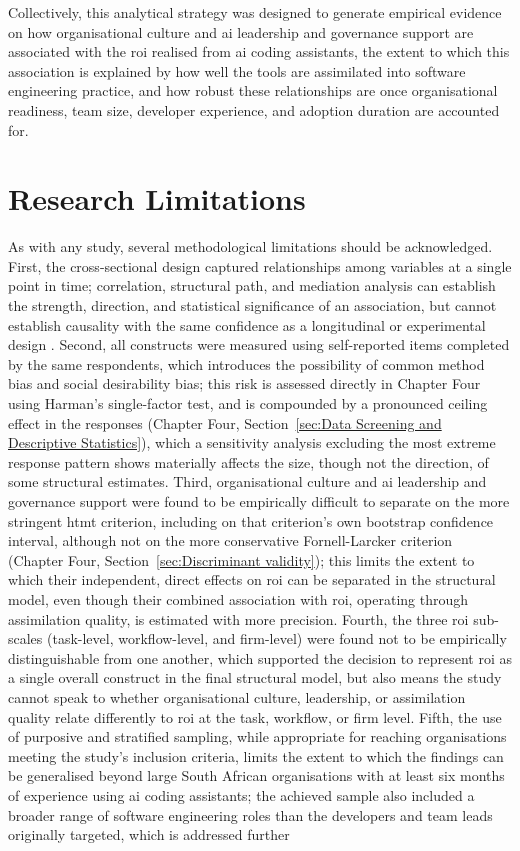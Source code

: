 Collectively, this analytical strategy was designed to generate empirical evidence on how organisational culture and \gls{ai} leadership and governance support are associated with the \gls{roi} realised from \gls{ai} coding assistants, the extent to which this association is explained by how well the tools are assimilated into software engineering practice, and how robust these relationships are once organisational readiness, team size, developer experience, and adoption duration are accounted for.

\section{Research Limitations}
\label{sec:Research Limitations}
As with any study, several methodological limitations should be acknowledged. First, the cross-sectional design captured relationships among variables at a single point in time; correlation, structural path, and mediation analysis can establish the strength, direction, and statistical significance of an association, but cannot establish causality with the same confidence as a longitudinal or experimental design \autocite{Creswell2018}. Second, all constructs were measured using self-reported items completed by the same respondents, which introduces the possibility of common method bias and social desirability bias; this risk is assessed directly in Chapter Four using Harman's single-factor test, and is compounded by a pronounced ceiling effect in the responses (Chapter Four, Section~\ref{sec:Data Screening and Descriptive Statistics}), which a sensitivity analysis excluding the most extreme response pattern shows materially affects the size, though not the direction, of some structural estimates. Third, organisational culture and \gls{ai} leadership and governance support were found to be empirically difficult to separate on the more stringent \gls{htmt} criterion, including on that criterion's own bootstrap confidence interval, although not on the more conservative Fornell-Larcker criterion (Chapter Four, Section~\ref{sec:Discriminant validity}); this limits the extent to which their independent, direct effects on \gls{roi} can be separated in the structural model, even though their combined association with \gls{roi}, operating through assimilation quality, is estimated with more precision. Fourth, the three \gls{roi} sub-scales (task-level, workflow-level, and firm-level) were found not to be empirically distinguishable from one another, which supported the decision to represent \gls{roi} as a single overall construct in the final structural model, but also means the study cannot speak to whether organisational culture, leadership, or assimilation quality relate differently to \gls{roi} at the task, workflow, or firm level. Fifth, the use of purposive and stratified sampling, while appropriate for reaching organisations meeting the study's inclusion criteria, limits the extent to which the findings can be generalised beyond large South African organisations with at least six months of experience using \gls{ai} coding assistants; the achieved sample also included a broader range of software engineering roles than the developers and team leads originally targeted, which is addressed further 